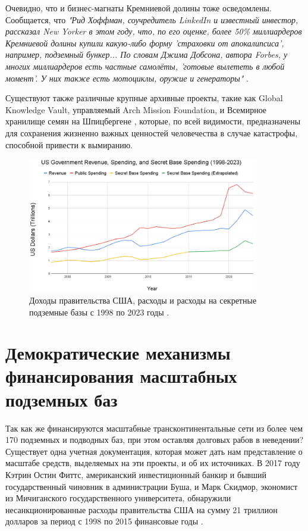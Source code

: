 \documentclass[10pt,twocolumn,letterpaper]{article}
\begin{document}
Очевидно, что и бизнес-магнаты Кремниевой долины тоже осведомлены. Сообщается, что \textit{"Рид Хоффман, соучредитель LinkedIn и известный инвестор, рассказал New Yorker в этом году, что, по его оценке, более 50\% миллиардеров Кремниевой долины купили какую-либо форму 'страховки от апокалипсиса', например, подземный бункер... По словам Джима Добсона, автора Forbes, у многих миллиардеров есть частные самолёты, 'готовые вылететь в любой момент'. У них также есть мотоциклы, оружие и генераторы"} \cite{28}.

Существуют также различные крупные архивные проекты, такие как Global Knowledge Vault, управляемый Arch Mission Foundation, \cite{29} и Всемирное хранилище семян на Шпицбергене \cite{30}, которые, по всей видимости, предназначены для сохранения жизненно важных ценностей человечества в случае катастрофы, способной привести к вымиранию.
\begin{figure}[t]
\begin{center}
\includegraphics[width=0.9\textwidth]{govcrop2.png}
\end{center}
   \caption{Доходы правительства США, расходы и расходы на секретные подземные базы с 1998 по 2023 годы \cite{19}.}
   \label{fig:9}
\end{figure}

\section{Демократические механизмы финансирования масштабных подземных баз}

Так как же финансируются масштабные трансконтинентальные сети из более чем 170 подземных и подводных баз, при этом оставляя долговых рабов в неведении? Существует одна учетная документация, которая может дать нам представление о масштабе средств, выделяемых на эти проекты, и об их источниках. В 2017 году Кэтрин Остин Фиттс, американский инвестиционный банкир и бывший государственный чиновник в администрации Буша, и Марк Скидмор, экономист из Мичиганского государственного университета, обнаружили несанкционированные расходы правительства США на сумму 21 триллион долларов за период с 1998 по 2015 финансовые годы \cite{11,12,13}.
\end{document}
